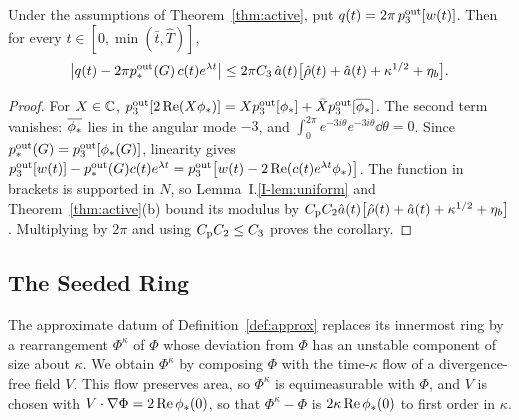 \begin{corollary}
\label{cor:active-moment}
Under the assumptions of Theorem~\ref{thm:active}, put
$q(t)=2\pi\,p^{\mathrm{out}}_3[w(t)]$. Then for every $t\in[0,\min(\bar t,\hat T)]$,
\begin{equation}
\label{eq:active-moment}
\big|q(t)-2\pi p^{\mathrm{out}}_*(G)\,c(t)e^{\lambda t}\big|\le2\pi C_3\,\hat a(t)\big[\hat\rho(t)+\hat a(t)+\kappa^{1/2}+\eta_b\big].
\end{equation}
\end{corollary}
\begin{proof}
For $X\in\mathbb{C}$, $p^{\mathrm{out}}_3[2\Re(X\phi_*)]=Xp^{\mathrm{out}}_3[\phi_*]+\bar Xp^{\mathrm{out}}_3[\overline{\phi_*}]$. The
second term vanishes: $\overline{\phi_*}$ lies in the angular mode $-3$, and
$\int_0^{2\pi}e^{-3i\theta}e^{-3i\theta}\dd\theta=0$. Since
$p^{\mathrm{out}}_*(G)=p^{\mathrm{out}}_3[\phi_*(G)]$, linearity gives
$p^{\mathrm{out}}_3[w(t)]-p^{\mathrm{out}}_*(G)c(t)e^{\lambda t}=p^{\mathrm{out}}_3\big[w(t)-2\Re(c(t)e^{\lambda t}\phi_*)\big]$.
The function in brackets is supported in $N$, so Lemma~I.\ref{I-lem:uniform} and
Theorem~\ref{thm:active}\textup{(b)} bound its modulus by
$C_{\mathrm{p}} C_2\hat a(t)\big[\hat\rho(t)+\hat a(t)+\kappa^{1/2}+\eta_b\big]$. Multiplying by $2\pi$
and using $C_{\mathrm{p}} C_2\le C_3$ proves the corollary.
\end{proof}

\subsection{The Seeded Ring}

The approximate datum of Definition~\ref{def:approx} replaces its innermost ring by
a rearrangement $\Phi^\kappa$ of $\Phi$ whose deviation from $\Phi$ has an unstable
component of size about $\kappa$. We obtain $\Phi^\kappa$ by composing $\Phi$ with
the time-$\kappa$ flow of a divergence-free field $V$. This flow preserves area, so
$\Phi^\kappa$ is equimeasurable with $\Phi$, and $V$ is chosen with
$V\cdot\nabla\Phi=2\Re\phi_*(0)$, so that $\Phi^\kappa-\Phi$ is $2\kappa\Re\phi_*(0)$ to
first order in $\kappa$.

